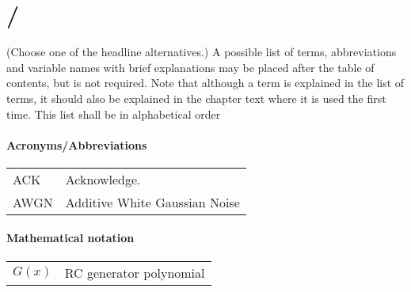 \section*{/}\label{sec:terminology}
{} %
(Choose one of the headline alternatives.) 
A possible list of terms, abbreviations and variable names with brief explanations may be placed
after the table of contents, but is not required.  Note that although a term is explained in the
list of terms, it should also be explained in the chapter text where it is used the first time. This
list shall be in alphabetical order

\paragraph{Acronyms/Abbreviations}

\begin{table}[ht!]
  \begin{tabular}{l l}
  ACK & Acknowledge.\\
  AWGN & Additive White Gaussian Noise\\
  \end{tabular}
\end{table}

\paragraph{Mathematical notation}

\begin{table}[ht!]
  \begin{tabular}{l l}
  $G(x)$ & RC generator polynomial\\
  \end{tabular}
\end{table}
